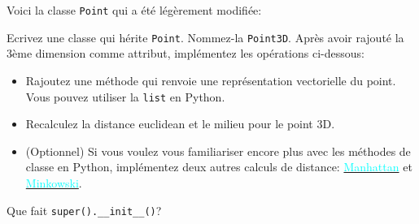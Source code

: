 \begin{Exercice}[10 minutes]
	Voici la classe \lstinline{Point} qui a été légèrement modifiée:
	 

	Ecrivez une classe qui hérite \lstinline{Point}. Nommez-la \lstinline{Point3D}. Après avoir rajouté la 3ème dimension comme attribut, implémentez les opérations ci-dessous:

	\begin{itemize}
		\item Rajoutez une méthode qui renvoie une représentation vectorielle du point. Vous pouvez utiliser la \lstinline{list} en Python.
		\item Recalculez la distance euclidean et le milieu pour le point 3D.
		\item (Optionnel) Si vous voulez vous familiariser encore plus avec les méthodes de classe en Python, implémentez deux autres calculs de distance: \href{https://fr.wikipedia.org/wiki/Distance_de_Manhattan}{\textcolor{cyan}{Manhattan}} et \href{https://en.wikipedia.org/wiki/Minkowski_distance}{\textcolor{cyan}{Minkowski}}.
	\end{itemize}
	 

	\begin{conseil}

	Que fait \lstinline{super().__init__()}?

	\end{conseil}
	\begin{solution}
	 
	\end{solution}
	\end{Exercice} 

